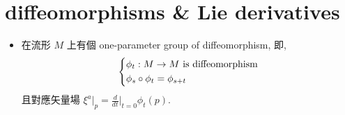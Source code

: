 \section{diffeomorphisms \& Lie derivatives}
\begin{itemize}
	\item 在流形 $M$ 上有個 one-parameter group of diffeomorphism, 即,
	\begin{equation}
		\begin{dcases}
			\phi_t : M \rightarrow M \text{ is diffeomorphism} \\
			\phi_s \circ \phi_t = \phi_{s + t}
		\end{dcases}  \label{B.2.1}
	\end{equation}
	且對應矢量場 $\xi^a \Big|_p = \frac{d}{dt} \Big|_{t = 0} \phi_t(p)$.
\end{itemize}

